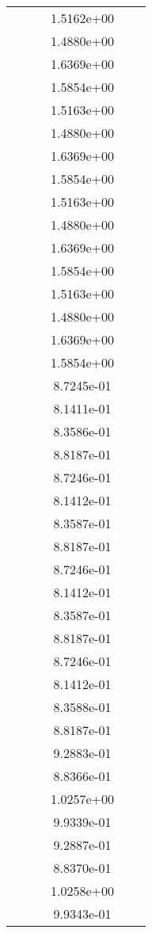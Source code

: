 \begin{xltabular}{\textwidth}{r|rS[table-format=1.3e+2]S[table-format=1.4e+2]S[table-format=1.4e+2]S[table-format=-1.5]}
&  &  & 1.5162e+00 & & \\
&  &  & 1.4880e+00 & & \\
&  &  & 1.6369e+00 & & \\
&  &  & 1.5854e+00 & & \\
&  &  & 1.5163e+00 & & \\
&  &  & 1.4880e+00 & & \\
&  &  & 1.6369e+00 & & \\
&  &  & 1.5854e+00 & & \\
&  &  & 1.5163e+00 & & \\
&  &  & 1.4880e+00 & & \\
&  &  & 1.6369e+00 & & \\
&  &  & 1.5854e+00 & & \\
&  &  & 1.5163e+00 & & \\
&  &  & 1.4880e+00 & & \\
&  &  & 1.6369e+00 & & \\
&  &  & 1.5854e+00 & & \\
&  &  & 8.7245e-01 & & \\
&  &  & 8.1411e-01 & & \\
&  &  & 8.3586e-01 & & \\
&  &  & 8.8187e-01 & & \\
&  &  & 8.7246e-01 & & \\
&  &  & 8.1412e-01 & & \\
&  &  & 8.3587e-01 & & \\
&  &  & 8.8187e-01 & & \\
&  &  & 8.7246e-01 & & \\
&  &  & 8.1412e-01 & & \\
&  &  & 8.3587e-01 & & \\
&  &  & 8.8187e-01 & & \\
&  &  & 8.7246e-01 & & \\
&  &  & 8.1412e-01 & & \\
&  &  & 8.3588e-01 & & \\
&  &  & 8.8187e-01 & & \\
&  &  & 9.2883e-01 & & \\
&  &  & 8.8366e-01 & & \\
&  &  & 1.0257e+00 & & \\
&  &  & 9.9339e-01 & & \\
&  &  & 9.2887e-01 & & \\
&  &  & 8.8370e-01 & & \\
&  &  & 1.0258e+00 & & \\
&  &  & 9.9343e-01 & & \\

\end{xltabular}

